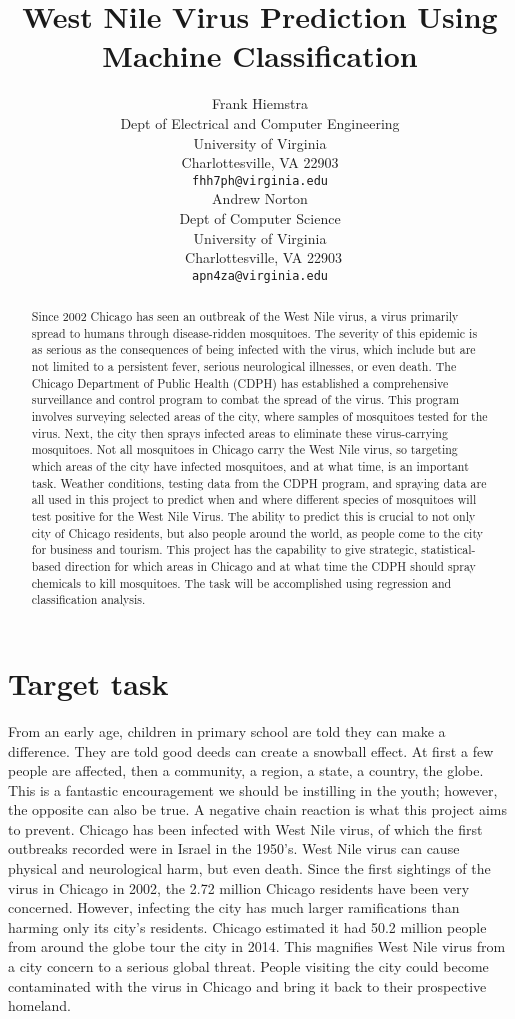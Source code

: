 \documentclass{article} %
\title{West Nile Virus Prediction Using Machine Classification}
\author{
Frank Hiemstra \\
Dept of Electrical and Computer Engineering\\
University of Virginia\\
Charlottesville, VA 22903\\
\texttt{fhh7ph@virginia.edu} \\
\And
Andrew Norton \\
Dept of Computer Science \\
University of Virginia \\\
Charlottesville, VA 22903 \\
\texttt{apn4za@virginia.edu} \\
}
\begin{document}
\maketitle

\begin{abstract}
Since 2002 Chicago has seen an outbreak of the West Nile virus, a virus primarily spread to humans through disease-ridden mosquitoes. The severity of this epidemic is as serious as the consequences of being infected with the virus, which include but are not limited to a persistent fever, serious neurological illnesses, or even death.  The Chicago Department of Public Health (CDPH) has established a comprehensive surveillance and control program to combat the spread of the virus.  This program involves surveying selected areas of the city, where samples of mosquitoes tested for the virus.  Next, the city then sprays infected areas to eliminate these virus-carrying mosquitoes.  Not all mosquitoes in Chicago carry the West Nile virus, so targeting which areas of the city have infected mosquitoes, and at what time, is an important task.  Weather conditions, testing data from the CDPH program, and spraying data are all used in this project to predict when and where different species of mosquitoes will test positive for the West Nile Virus. The ability to predict this is crucial to not only city of Chicago residents, but also people around the world, as people come to the city for business and tourism.  This project has the capability to give strategic, statistical-based direction for which areas in Chicago and at what time the CDPH should spray chemicals to kill mosquitoes.  The task will be accomplished using regression and classification analysis.
\end{abstract}

\section{Target task}
From an early age, children in primary school are told they can make a difference.  They are told good deeds can create a snowball effect.  At first a few people are affected, then a community, a region, a state, a country, the globe.  This is a fantastic encouragement we should be instilling in the youth; however, the opposite can also be true.  A negative chain reaction is what this project aims to prevent.  Chicago has been infected with West Nile virus, of which the first outbreaks recorded were in Israel in the 1950’s. West Nile virus can cause physical and neurological harm, but even death.  Since the first sightings of the virus in Chicago in 2002, the 2.72 million Chicago residents have been very concerned.  However, infecting the city has much larger ramifications than harming only its city’s residents.  Chicago estimated it had 50.2 million people from around the globe tour the city in 2014.  This magnifies West Nile virus from a city concern to a serious global threat. People visiting the city could become contaminated with the virus in Chicago and bring it back to their prospective homeland.  
\end{document}

